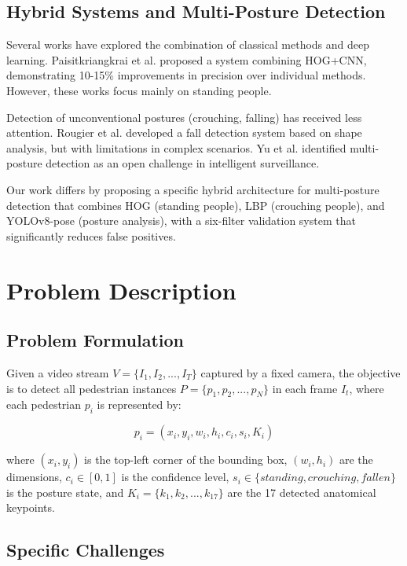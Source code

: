 \documentclass[conference]{IEEEtran}
\begin{document}
\subsection{Hybrid Systems and Multi-Posture Detection}

Several works have explored the combination of classical methods and deep learning. Paisitkriangkrai et al. \cite{paisitkriangkrai2016effective} proposed a system combining HOG+CNN, demonstrating 10-15\% improvements in precision over individual methods. However, these works focus mainly on standing people.

Detection of unconventional postures (crouching, falling) has received less attention. Rougier et al. \cite{rougier2011robust} developed a fall detection system based on shape analysis, but with limitations in complex scenarios. Yu et al. \cite{yu2012survey} identified multi-posture detection as an open challenge in intelligent surveillance.

Our work differs by proposing a specific hybrid architecture for multi-posture detection that combines HOG (standing people), LBP (crouching people), and YOLOv8-pose (posture analysis), with a six-filter validation system that significantly reduces false positives.

\section{Problem Description}

\subsection{Problem Formulation}

Given a video stream $V = \{I_1, I_2, ..., I_T\}$ captured by a fixed camera, the objective is to detect all pedestrian instances $P = \{p_1, p_2, ..., p_N\}$ in each frame $I_t$, where each pedestrian $p_i$ is represented by:

\begin{equation}
p_i = (x_i, y_i, w_i, h_i, c_i, s_i, K_i)
\end{equation}

where $(x_i, y_i)$ is the top-left corner of the bounding box, $(w_i, h_i)$ are the dimensions, $c_i \in [0,1]$ is the confidence level, $s_i \in \{standing, crouching, fallen\}$ is the posture state, and $K_i = \{k_1, k_2, ..., k_{17}\}$ are the 17 detected anatomical keypoints.

\subsection{Specific Challenges}
\end{document}
